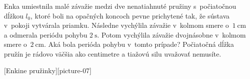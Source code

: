 Enka umiestnila malé závažie medzi dve nenatiahnuté pružiny
s~počiatočnou dĺžkou $l_0$, ktoré boli na opačných koncoch pevne
prichytené tak, že sústava v~pokoji vytvárala priamku. Následne
vychýlila závažie v~kolmom smere o~$\SI{1}{\centi\metre}$ a odmerala
periódu pohybu $\SI{2}{\second}$. Potom vychýlila závažie dvojnásobne
v~kolmom smere o~$\SI{2}{\centi\metre}$. Aká bola perióda pohybu v~tomto
prípade? Počiatočná dĺžka pružín je rádovo väčšia ako centimetre a
tiažovú silu uvažovať nemusíte.

[Enkine pružinky][picture-07]

